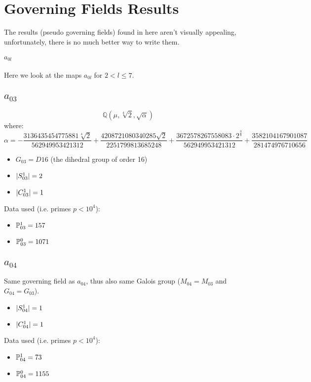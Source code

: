 
\section{Governing Fields Results}
\label{governingFieldsResults}
The results (pseudo governing fields) found in here aren't visually appealing, unfortunately, there is no much better way to write them.
\paragraph{{\LARGE $a_{0l}$}}
Here we look at the maps $a_{0l}$ for $2 < l \leq 7$.
\subsection{{\huge $a_{03}$}}
$$\mathbb{Q}\left(\mu, \sqrt[4]{2}, \sqrt{\alpha}\right)$$
where:
$$\alpha = - \frac{3136435454775881 \sqrt[4]{2}}{562949953421312} + \frac{4208721080340285 \sqrt{2}}{2251799813685248} + \frac{3672578267558083 \cdot 2^{\frac{3}{4}}}{562949953421312} + \frac{3582104167901087}{281474976710656}$$
\begin{itemize}
	\item $G_{03} = D16$ (the dihedral group of order 16)
	\item $| S_{03}^1 | = 2$
	\item $| C_{03}^1 | = 1$
\end{itemize}
Data used (i.e. primes $p<10^4$):
\begin{itemize}
	\item $\mathbb{P}_{03}^1 = 157$
	\item $\mathbb{P}_{03}^0 = 1071$
\end{itemize}
\subsection{{\huge $a_{04}$}}
Same governing field as $a_{04}$, thus also same Galois group ($M_{04} = M_{03}$ and $G_{04} = G_{03}$).
\begin{itemize}
	\item $| S_{04}^1 | = 1$
	\item $| C_{04}^1 | = 1$
\end{itemize}
Data used (i.e. primes $p<10^4$):
\begin{itemize}
	\item $\mathbb{P}_{04}^1 = 73$
	\item $\mathbb{P}_{04}^0 = 1155$
\end{itemize}
